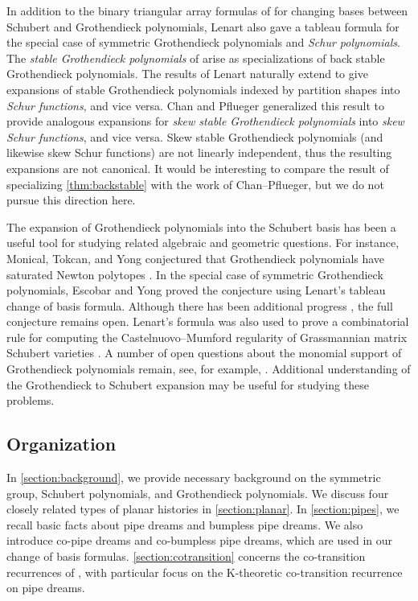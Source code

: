 \documentclass[12 pt]{amsart}
\numberwithin{equation}{section}
\theoremstyle{remark}
\begin{document}
In addition to the binary triangular array formulas of \cite{Lenart,Lascoux.03} for changing bases between Schubert and Grothendieck polynomials, Lenart \cite{Lenart.2000} also gave a tableau formula for the special case of symmetric Grothendieck polynomials and \emph{Schur polynomials}.
The \emph{stable Grothendieck polynomials} of \cite{Fomin.Kirillov} arise as specializations of back stable Grothendieck polynomials. 
The results of Lenart \cite{Lenart.2000} naturally extend to give expansions of stable Grothendieck polynomials indexed by partition shapes into \emph{Schur functions}, and vice versa. 
Chan and Pflueger \cite{Chan.Pflueger} generalized this result to provide analogous expansions for \emph{skew stable Grothendieck polynomials} into \emph{skew Schur functions}, and vice versa. 
Skew stable Grothendieck polynomials (and likewise skew Schur functions) are not linearly independent, thus the resulting expansions are not canonical. 
It would be interesting to compare the result of specializing \cref{thm:backstable} with the work of Chan--Pflueger, but we do not pursue this direction here.

The expansion of Grothendieck polynomials into the Schubert basis has been a useful tool for studying related algebraic and geometric questions.
For instance, Monical, Tokcan, and Yong conjectured that Grothendieck polynomials have saturated Newton polytopes \cite{Monical.Tokcan.Yong}. In the special case of symmetric Grothendieck polynomials, Escobar and Yong \cite{Escobar.Yong} proved the conjecture using Lenart's tableau change of basis formula. 
Although there has been additional progress \cite{Meszaros.StDizier,CCRMM}, the full conjecture remains open. Lenart's formula was also used to prove a combinatorial rule for computing the Castelnuovo--Mumford regularity of Grassmannian matrix Schubert varieties \cite{RRRSW}. 
A number of open questions about the monomial support of Grothendieck polynomials remain, see, for example, \cite{Meszaros.Setiabrata.StDizier}. 
Additional understanding of the Grothendieck to Schubert expansion may be useful for studying these problems.

	
	\subsection{Organization}
	In \cref{section:background}, we provide necessary background on the symmetric group, Schubert polynomials, and Grothendieck polynomials. 
	We discuss four closely related types of planar histories in \cref{section:planar}. 
	In \cref{section:pipes}, we recall basic facts about pipe dreams and bumpless pipe dreams. 
	We also introduce co-pipe dreams and co-bumpless pipe dreams, which are used in our change of basis formulas. 
	\cref{section:cotransition} concerns the co-transition recurrences of \cite{Knutson:cotransition}, with particular focus on the K-theoretic co-transition recurrence on pipe dreams.
	
\end{document}
